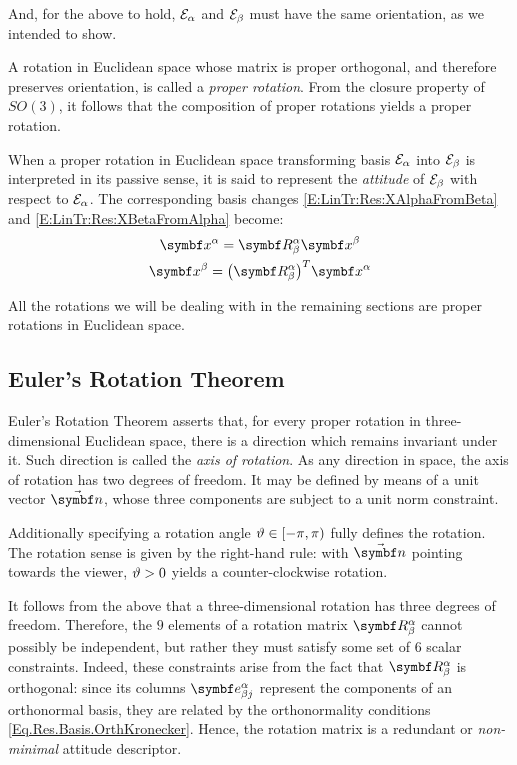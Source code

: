 And, for the above to hold, $\basis[\alpha]$ and $\basis[\beta]$ must have the same orientation, as we intended to show.

A rotation in Euclidean space whose matrix is proper orthogonal, and therefore preserves orientation, is called a \emph{proper rotation}. From the closure property of $SO(3)$, it follows that the composition of proper rotations yields a proper rotation.

When a proper rotation in Euclidean space transforming basis $\basis[\alpha]$ into $\basis[\beta]$ is interpreted in its passive sense, it is said to represent the \emph{attitude} of $\basis[\beta]$ with respect to $\basis[\alpha]$. The corresponding basis changes \eqref{E:LinTr:Res:XAlphaFromBeta} and \eqref{E:LinTr:Res:XBetaFromAlpha} become:
\begin{gather}
\vprj{x}{\alpha} = \RotM{\alpha}{\beta} \vprj{x}{\beta} \label{E:LinTr:Res:RotXAlphaFromBeta}\\
\vprj{x}{\beta} = \trp{\RotM{\alpha}{\beta}} \vprj{x}{\alpha } \label{E:LinTr:Res:RotXBetaFromAlpha}
\end{gather}

All the rotations we will be dealing with in the remaining sections are proper rotations in Euclidean space.

\subsection{Euler's Rotation Theorem} %
Euler's Rotation Theorem asserts that, for every proper rotation in three-dimen\-sional Euclidean space, there is a direction which remains invariant under it. Such direction is called the \emph{axis of rotation}. As any direction in space, the axis of rotation has two degrees of freedom. It may be defined by means of a unit vector $\vabs{\rotax}$, whose three components are subject to a unit norm constraint.

Additionally specifying a rotation angle $\rotang \in \left[-\pi,\pi\right)$ fully defines the rotation. The rotation sense is given by the right-hand rule: with $\vabs{\rotax}$ pointing towards the viewer, $\rotang>0$ yields a counter-clockwise rotation.

It follows from the above that a three-dimensional rotation has three degrees of freedom. Therefore, the $9$ elements of a rotation matrix $\RotM{\alpha}{\beta}$ cannot possibly be independent, but rather they must satisfy some set of $6$ scalar constraints. Indeed, these constraints arise from the fact that $\RotM{\alpha}{\beta}$ is orthogonal: since its columns $\vsubprj{\bv}{\beta j}{\alpha}$ represent the components of an orthonormal basis, they are related by the orthonormality conditions \eqref{Eq.Res.Basis.OrthKronecker}. Hence, the rotation matrix is a redundant or \emph{non-minimal} attitude descriptor.

